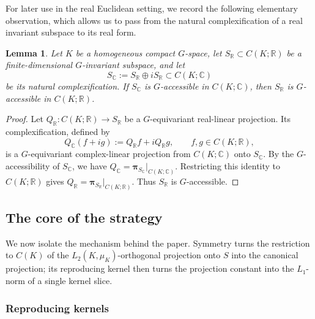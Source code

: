 \documentclass[11pt,showkeys]{amsart}
\newtheorem{lemma}[theorem]{Lemma}
\begin{document}
For later use in the real Euclidean setting, we record the following
elementary observation, which allows us to pass from the natural
complexification of a real invariant subspace to its real form.

\begin{lemma}
\label{lem: acR-acC}
Let \(K\) be a homogeneous compact \(G\)-space, let
\(S_{\mathbb R}\subset C(K;\mathbb R)\) be a finite-dimensional
\(G\)-invariant subspace, and let
\[
    S_{\mathbb C}
    :=
    S_{\mathbb R}\oplus iS_{\mathbb R}
    \subset C(K;\mathbb C)
\]
be its natural complexification. If \(S_{\mathbb C}\) is
\(G\)-accessible in \(C(K;\mathbb C)\), then \(S_{\mathbb R}\) is
\(G\)-accessible in \(C(K;\mathbb R)\).
\end{lemma}

\begin{proof}
Let
\(
    Q_{\mathbb R}\colon C(K;\mathbb R)\longrightarrow S_{\mathbb R}
\)
be a \(G\)-equivariant real-linear projection. Its complexification,
defined by
\[
    Q_{\mathbb C}(f+ig)
    :=
    Q_{\mathbb R}f+iQ_{\mathbb R}g,
    \qquad f,g\in C(K;\mathbb R),
\]
is a \(G\)-equivariant complex-linear projection from
\(C(K;\mathbb C)\) onto \(S_{\mathbb C}\). By the
\(G\)-accessibility of \(S_{\mathbb C}\), we have
\(
    Q_{\mathbb C}
    =
    \mathbf\pi_{S_{\mathbb C}}\big|_{C(K;\mathbb C)}.
\)
Restricting this identity to \(C(K;\mathbb R)\) gives
\(
    Q_{\mathbb R}
    =
    \mathbf\pi_{S_{\mathbb R}}\big|_{C(K;\mathbb R)}.
\)
Thus \(S_{\mathbb R}\) is \(G\)-accessible.
\end{proof}



\subsection{The core of the strategy}
\label{The core of the strategy}

We now isolate the mechanism behind the paper.
Symmetry turns the restriction to \(C(K)\) of the \(L_2(K,\mu_K)\)-orthogonal
projection onto \(S\) into the canonical projection; its
reproducing kernel then turns the projection constant into the
\(L_1\)-norm of a single kernel slice.


\subsubsection{Reproducing kernels}
\label{Reproducing kernels}
\end{document}

